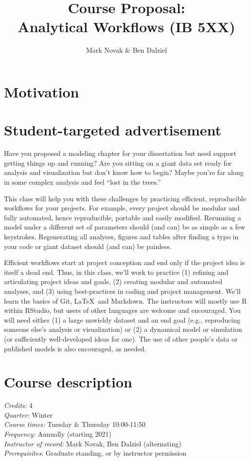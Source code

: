 \documentclass[10pt]{article}
\author{Mark Novak \& Ben Dalziel}
\title{Course Proposal:\\Analytical Workflows (IB 5XX)}
\begin{document}
\maketitle
\date{}

\section*{Motivation}

\section*{Student-targeted advertisement}
Have you proposed a modeling chapter for your dissertation but need support getting things up and running?  Are you sitting on a giant data set ready for analysis and visualization but don't know how to begin?  Maybe you're far along in some complex analysis and feel ``lost in the trees.''

This class will help you with these challenges by practicing efficient, reproducible workflows for your projects.  For example, every project should be modular and fully automated, hence reproducible, portable and easily modified.  Rerunning a model under a different set of parameters should (and can) be as simple as a few keystrokes. Regenerating all analyses, figures and tables after finding a typo in your code or giant dataset should (and can) be painless.

Efficient workflows start at project conception and end only if the project idea is itself a dead end.  Thus, in this class, we'll work to practice (1) refining and articulating project ideas and goals, (2) creating modular and automated analyses, and (3) using best-practices in coding and project management. We'll learn the basics of Git, \LaTeX\ and Markdown.  The instructors will mostly use R within RStudio, but users of other languages are
welcome and encouraged.  You will need either (1) a large unwieldy dataset and an end goal (e.g., reproducing someone else's analysis or visualization) or (2) a dynamical model or simulation (or sufficiently well-developed ideas for one). The use of other people's data or published models is also encouraged, as needed.

\section*{Course description}
\emph{Credits:} 4\\
\emph{Quarter:} Winter\\
\emph{Course times:} Tuesday \& Thursday 10:00-11:50\\
\emph{Frequency:} Annually (starting 2021)\\
\emph{Instructor of record:} Mark Novak, Ben Dalziel (alternating)\\
\emph{Prerequisites}: Graduate standing, or by instructor permission\\
\end{document}
